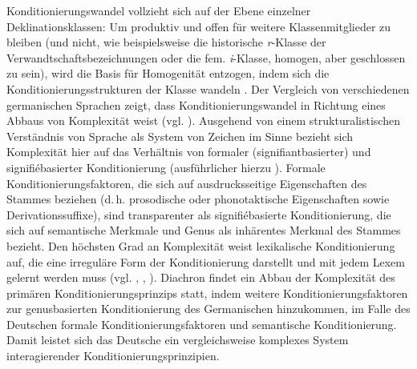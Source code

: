 Konditionierungswandel vollzieht sich auf der Ebene einzelner Deklinationsklassen: Um produktiv und offen für weitere Klassenmitglieder zu bleiben (und nicht, wie beispielsweise die historische \textit{r}{}-Klasse der Verwandtschaftsbezeichnungen oder die fem. \textit{i}{}-Klasse, homogen, aber geschlossen zu sein), wird die Basis für Homogenität entzogen, indem sich die Konditionierungsstrukturen der Klasse wandeln \citep[340--342]{Kürschner2008a}. Der Vergleich von verschiedenen germanischen Sprachen zeigt, dass Konditionierungswandel in Richtung eines Abbaus von Komplexität weist (vgl. \citealt[355--358]{Kürschner2008a}). Ausgehend von einem strukturalistischen Verständnis von Sprache als System von Zeichen im Sinne  bezieht sich Komplexität hier auf das Verhältnis von formaler (signifiantbasierter) und signifiébasierter Konditionierung (ausführlicher hierzu \citealt{DammelKürschner2008}). Formale Konditionierungsfaktoren, die sich auf ausdrucksseitige Eigenschaften des Stammes beziehen (d.\,h. prosodische oder phonotaktische Eigenschaften sowie Derivationssuffixe), sind transparenter als signifiébasierte Konditionierung, die sich auf semantische Merkmale und Genus als inhärentes Merkmal des Stammes bezieht. Den höchsten Grad an Komplexität weist lexikalische Konditionierung auf, die eine irreguläre Form der Konditionierung darstellt und mit jedem Lexem gelernt werden muss (vgl. \citealt[310--314]{Kürschner2008a}, \citealt[474--476]{Neef2000}, \citealt{VerslootAdamczyk2018}). Diachron findet ein Abbau der Komplexität des primären Konditionierungsprinzips statt, indem weitere Konditionierungsfaktoren zur genusbasierten Konditionierung des Germanischen hinzukommen, im Falle des Deutschen formale Konditionierungsfaktoren und semantische Konditionierung. Damit leistet sich das Deutsche ein vergleichsweise komplexes System interagierender Konditionierungsprinzipien.
